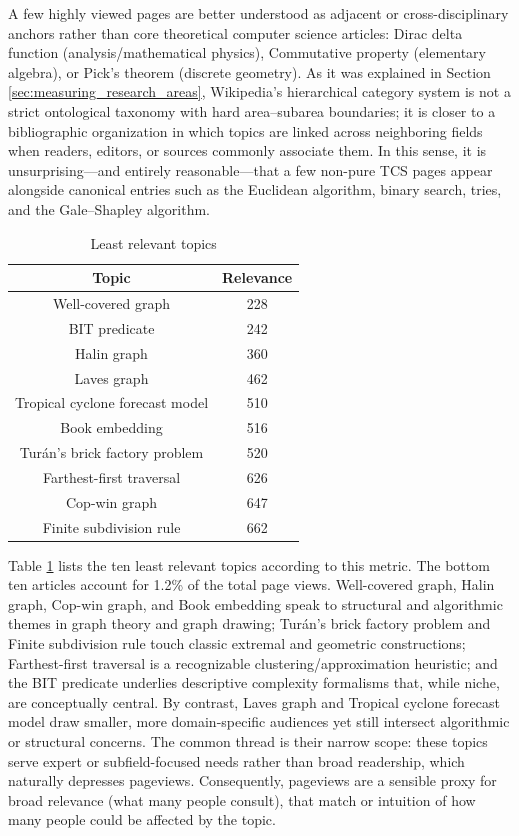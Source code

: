 A few highly viewed pages are better understood as adjacent or cross-disciplinary anchors rather than core theoretical computer science articles: Dirac delta function (analysis/mathematical physics), Commutative property (elementary algebra), or Pick’s theorem (discrete geometry). As it was explained in Section \ref{sec:measuring_research_areas}, Wikipedia’s hierarchical category system is not a strict ontological taxonomy with hard area–subarea boundaries; it is closer to a bibliographic organization in which topics are linked across neighboring fields when readers, editors, or sources commonly associate them. In this sense, it is unsurprising—and entirely reasonable—that a few non-pure TCS pages appear alongside canonical entries such as the Euclidean algorithm, binary search, tries, and the Gale–Shapley algorithm. 

\begin{table}
\begin{centering}
\begin{tabular}{|c|c|}
\hline 
Topic & Relevance \tabularnewline
\hline 
\hline 
Well-covered graph & 228 \tabularnewline
\hline 
BIT predicate	 & 242 \tabularnewline
\hline 
Halin graph & 360 \tabularnewline
\hline 
Laves graph & 462 \tabularnewline
\hline 
Tropical cyclone forecast model & 510 \tabularnewline
\hline 
Book embedding & 516 \tabularnewline
\hline 
Turán's brick factory problem & 520 \tabularnewline
\hline 
Farthest-first traversal & 626 \tabularnewline
\hline 
Cop-win graph & 647 \tabularnewline
\hline 
Finite subdivision rule & 662 \tabularnewline
\hline 
\end{tabular}
\par\end{centering}
\caption{\label{tab:Least-Relevant-Topics}Least relevant topics}
\end{table}

Table \ref{tab:Least-Relevant-Topics} lists the ten least relevant topics according to this metric. The bottom ten articles account for 1.2\% of the total page views. Well-covered graph, Halin graph, Cop-win graph, and Book embedding speak to structural and algorithmic themes in graph theory and graph drawing; Turán’s brick factory problem and Finite subdivision rule touch classic extremal and geometric constructions; Farthest-first traversal is a recognizable clustering/approximation heuristic; and the BIT predicate underlies descriptive complexity formalisms that, while niche, are conceptually central. By contrast, Laves graph and Tropical cyclone forecast model draw smaller, more domain-specific audiences yet still intersect algorithmic or structural concerns. The common thread is their narrow scope: these topics serve expert or subfield-focused needs rather than broad readership, which naturally depresses pageviews. Consequently, pageviews are a sensible proxy for broad relevance (what many people consult), that match or intuition of how many people could be affected by the topic.

